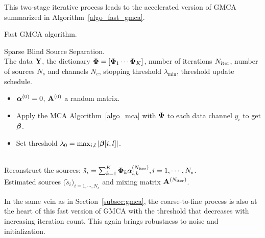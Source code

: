 This two-stage iterative process leads to the accelerated version of GMCA summarized in Algorithm~\ref{algo_fast_gmca}.
{\linespread{1}
\begin{algorithm}[htb]
\caption{Fast GMCA algorithm.}
\label{algo_fast_gmca}
 Sparse Blind Source Separation.\\
 The data $\mathbf{Y}$, the dictionary ${\bf\Phi}=[{\bf\Phi}_1 \cdots {\bf\Phi}_K]$, number of iterations $N_\mathrm{iter}$, number of sources $N_s$ and channels $N_c$, 
stopping threshold $\lambda_{\min}$, threshold update schedule.\\
\begin{itemize}
\item ${\boldsymbol \alpha}^{(0)} = 0$,  ${\mathbf{A}}^{(0)}$ a random matrix.
\item Apply the MCA Algorithm~\ref{algo_mca} with ${\bf\Phi}$ to each data channel $y_i$ to get ${\boldsymbol \beta}$.
\item Set threshold $\lambda_0 = \max_{i,l}\left|{\boldsymbol \beta}[i,l]\right|$.
\end{itemize}
 \\
Reconstruct the sources: $\tilde{s}_i   =    \sum_{k=1}^K {{\bf\Phi}}_{k}  \alpha^{(N_\mathrm{iter})}_{i,k}, i=1,\cdots,N_s$.\\
 Estimated sources $\big(\tilde{s}_i\big)_{i=1,\cdots,N_s}$ and mixing matrix ${{\mathbf{A}}}^{(N_\mathrm{iter})}$.
\end{algorithm}}

In the same vein as in Section~\ref{subsec:gmca}, the coarse-to-fine process is also at the heart of this fast version of GMCA 
with the threshold that decreases with increasing iteration count. This again brings robustness to noise and initialization.


